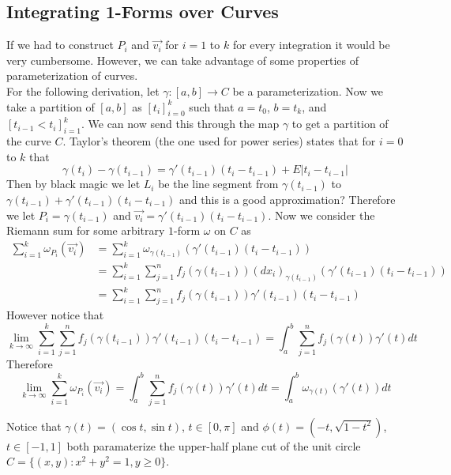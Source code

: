 \documentclass[notes.tex]{subfiles}
\begin{document}
\subsection{Integrating 1-Forms over Curves}
If we had to construct $P_i$ and $\vec{v_i}$ for $i = 1$ to $k$ for every integration it would be very cumbersome. However, we can take advantage of some properties of parameterization of curves. \\
For the following derivation, let $\gamma\colon[a, b] \to C$ be a parameterization. Now we take a partition of $[a, b]$ as $[t_i]_{i = 0}^k$ such that $a = t_0$, $b = t_k$, and $[t_{i - 1} < t_i]_{i = 1}^k$. We can now send this through the map $\gamma$ to get a partition of the curve $C$. Taylor's theorem (the one used for power series) states that for $i = 0$ to $k$ that
\[
    \gamma(t_i) - \gamma(t_{i - 1}) = \gamma'(t_{i - 1})(t_i - t_{i -1}) + E|t_i - t_{i - 1}|
\]
Then by black magic we let $L_i$ be the line segment from $\gamma(t_{i - 1})$ to $\gamma(t_{i - 1}) + \gamma'(t_{i - 1})(t_i - t_{i - 1})$ and this is a good approximation? Therefore we let $P_i = \gamma(t_{i - 1})$ and $\vec{v_i} = \gamma'(t_{i - 1})(t_i - t_{i - 1})$. Now we consider the Riemann sum for some arbitrary $1$-form $\omega$ on $C$ as
\begin{align*}
    \sum_{i = 1}^k \omega_{P_i}(\vec{v_i})
    &= \sum_{i = 1}^k \omega_{\gamma(t_{i - 1})}(\gamma'(t_{i - 1})(t_i - t_{i - 1})) \\
    &= \sum_{i = 1}^k \sum_{j = 1}^n f_j(\gamma(t_{i - 1}))(dx_i)_{\gamma(t_{i - 1})}(\gamma'(t_{i - 1})(t_i - t_{i - 1})) \\
    &= \sum_{i = 1}^k \sum_{j = 1}^n f_j(\gamma(t_{i - 1}))\gamma'(t_{i - 1})(t_i - t_{i - 1})
\end{align*}
However notice that
\[
    \lim_{k\to\infty} \sum_{i = 1}^k \sum_{j = 1}^n f_j(\gamma(t_{i - 1}))\gamma'(t_{i - 1})(t_i - t_{i - 1}) = \int_a^b \sum_{j = 1}^n f_j(\gamma(t))\gamma'(t)dt
\]
Therefore
\[
    \lim_{k\to\infty} \sum_{i = 1}^k \omega_{P_i}(\vec{v_i}) = \int_a^b \sum_{j = 1}^n f_j(\gamma(t))\gamma'(t)dt = \int_a^b \omega_{\gamma(t)}(\gamma'(t))dt
\]

Notice that $\gamma(t) = (\cos t, \sin t)$, $t \in [0, \pi]$ and $\phi(t) = (-t, \sqrt{1 - t^2})$, $t \in [-1, 1]$ both paramaterize the upper-half plane cut of the unit circle $C = \{ (x, y) : x^2 + y^2 = 1, y \geq 0 \}$.
\end{document}
